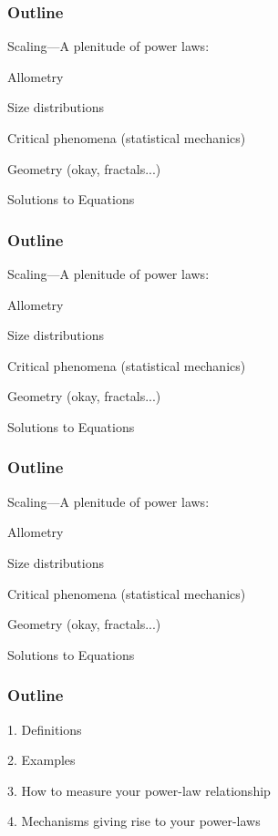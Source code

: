 \begin{frame}
  \frametitle{Outline}

  {Scaling---A plenitude of power laws:}

   Allometry

   Size distributions

   Critical phenomena {\small (statistical mechanics)}

  \inv

   Geometry {\small (okay, fractals...)}


   Solutions to Equations

\end{frame}

\begin{frame}
  \frametitle{Outline}

  {Scaling---A plenitude of power laws:}

   Allometry

   Size distributions

   Critical phenomena {\small (statistical mechanics)}

   Geometry {\small (okay, fractals...)}

  \inv

   Solutions to Equations

\end{frame}

\begin{frame}
  \frametitle{Outline}

  {Scaling---A plenitude of power laws:}

   Allometry

   Size distributions

   Critical phenomena {\small (statistical mechanics)}

   Geometry {\small (okay, fractals...)}

   Solutions to Equations

\end{frame}

\begin{frame}
  \frametitle{Outline}


1. Definitions

2. Examples

3. How to measure your power-law relationship

4. Mechanisms giving rise to your power-laws 


\end{frame}

